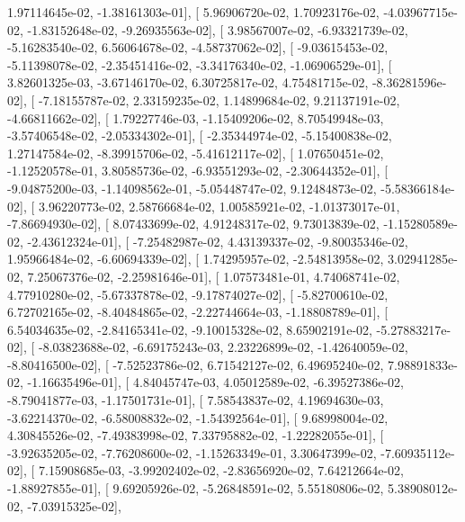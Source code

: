 \documentclass{article}
\begin{document}
          1.97114645e-02,  -1.38161303e-01],
       [  5.96906720e-02,   1.70923176e-02,  -4.03967715e-02,
         -1.83152648e-02,  -9.26935563e-02],
       [  3.98567007e-02,  -6.93321739e-02,  -5.16283540e-02,
          6.56064678e-02,  -4.58737062e-02],
       [ -9.03615453e-02,  -5.11398078e-02,  -2.35451416e-02,
         -3.34176340e-02,  -1.06906529e-01],
       [  3.82601325e-03,  -3.67146170e-02,   6.30725817e-02,
          4.75481715e-02,  -8.36281596e-02],
       [ -7.18155787e-02,   2.33159235e-02,   1.14899684e-02,
          9.21137191e-02,  -4.66811662e-02],
       [  1.79227746e-03,  -1.15409206e-02,   8.70549948e-03,
         -3.57406548e-02,  -2.05334302e-01],
       [ -2.35344974e-02,  -5.15400838e-02,   1.27147584e-02,
         -8.39915706e-02,  -5.41612117e-02],
       [  1.07650451e-02,  -1.12520578e-01,   3.80585736e-02,
         -6.93551293e-02,  -2.30644352e-01],
       [ -9.04875200e-03,  -1.14098562e-01,  -5.05448747e-02,
          9.12484873e-02,  -5.58366184e-02],
       [  3.96220773e-02,   2.58766684e-02,   1.00585921e-02,
         -1.01373017e-01,  -7.86694930e-02],
       [  8.07433699e-02,   4.91248317e-02,   9.73013839e-02,
         -1.15280589e-02,  -2.43612324e-01],
       [ -7.25482987e-02,   4.43139337e-02,  -9.80035346e-02,
          1.95966484e-02,  -6.60694339e-02],
       [  1.74295957e-02,  -2.54813958e-02,   3.02941285e-02,
          7.25067376e-02,  -2.25981646e-01],
       [  1.07573481e-01,   4.74068741e-02,   4.77910280e-02,
         -5.67337878e-02,  -9.17874027e-02],
       [ -5.82700610e-02,   6.72702165e-02,  -8.40484865e-02,
         -2.22744664e-03,  -1.18808789e-01],
       [  6.54034635e-02,  -2.84165341e-02,  -9.10015328e-02,
          8.65902191e-02,  -5.27883217e-02],
       [ -8.03823688e-02,  -6.69175243e-03,   2.23226899e-02,
         -1.42640059e-02,  -8.80416500e-02],
       [ -7.52523786e-02,   6.71542127e-02,   6.49695240e-02,
          7.98891833e-02,  -1.16635496e-01],
       [  4.84045747e-03,   4.05012589e-02,  -6.39527386e-02,
         -8.79041877e-03,  -1.17501731e-01],
       [  7.58543837e-02,   4.19694630e-03,  -3.62214370e-02,
         -6.58008832e-02,  -1.54392564e-01],
       [  9.68998004e-02,   4.30845526e-02,  -7.49383998e-02,
          7.33795882e-02,  -1.22282055e-01],
       [ -3.92635205e-02,  -7.76208600e-02,  -1.15263349e-01,
          3.30647399e-02,  -7.60935112e-02],
       [  7.15908685e-03,  -3.99202402e-02,  -2.83656920e-02,
          7.64212664e-02,  -1.88927855e-01],
       [  9.69205926e-02,  -5.26848591e-02,   5.55180806e-02,
          5.38908012e-02,  -7.03915325e-02],
\end{document}
